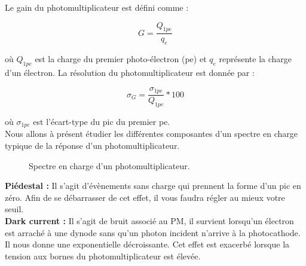 Le gain du photomultiplicateur est défini comme :

\begin{equation}
G = \frac{Q_{1pe}}{q_{e}} 
\end{equation}

où $Q_{1pe}$ est la charge du premier photo-électron (pe) et $q_{e}$ représente la charge d'un électron. La résolution du photomultiplicateur est donnée par :

\begin{equation}
\sigma_{G} =  \frac{\sigma_{1pe}}{Q_{1pe}} * 100
\end{equation}

où $\sigma_{1pe}$ est l'écart-type du pic du premier pe.\\

Nous allons à présent étudier les différentes composantes d'un spectre en charge typique de la réponse d'un photomultiplicateur.\\

\begin{figure}[!h]
    \caption{\label{fig:spectre} Spectre en charge d'un photomultiplicateur.}
\end{figure}

\textbf{Piédestal :} Il s'agit d'évènements sans charge qui prennent la forme d'un pic en zéro. Afin de se débarrasser de cet effet, il vous faudra régler au mieux votre seuil.\\

\textbf{Dark current :} Il s'agit de bruit associé au PM, il survient lorsqu'un électron est arraché à une dynode sans qu'un photon incident n'arrive à la photocathode. Il nous donne une exponentielle décroissante. Cet effet est exacerbé lorsque la tension aux bornes du photomultiplicateur est élevée. \\

